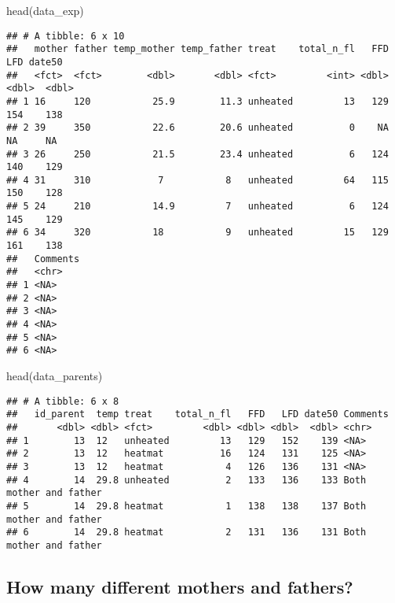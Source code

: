 \documentclass[
]{article}
\newenvironment{Shaded}{\begin{snugshade}}{\end{snugshade}}
\newcommand{\FunctionTok}[1]{\textcolor[rgb]{0.00,0.00,0.00}{#1}}
\newcommand{\NormalTok}[1]{#1}
\begin{document}
\begin{Shaded}
\begin{Highlighting}[]
\FunctionTok{head}\NormalTok{(data\_exp)}
\end{Highlighting}
\end{Shaded}

\begin{verbatim}
## # A tibble: 6 x 10
##   mother father temp_mother temp_father treat    total_n_fl   FFD   LFD date50
##   <fct>  <fct>        <dbl>       <dbl> <fct>         <int> <dbl> <dbl>  <dbl>
## 1 16     120           25.9        11.3 unheated         13   129   154    138
## 2 39     350           22.6        20.6 unheated          0    NA    NA     NA
## 3 26     250           21.5        23.4 unheated          6   124   140    129
## 4 31     310            7           8   unheated         64   115   150    128
## 5 24     210           14.9         7   unheated          6   124   145    129
## 6 34     320           18           9   unheated         15   129   161    138
##   Comments
##   <chr>   
## 1 <NA>    
## 2 <NA>    
## 3 <NA>    
## 4 <NA>    
## 5 <NA>    
## 6 <NA>
\end{verbatim}

\begin{Shaded}
\begin{Highlighting}[]
\FunctionTok{head}\NormalTok{(data\_parents)}
\end{Highlighting}
\end{Shaded}

\begin{verbatim}
## # A tibble: 6 x 8
##   id_parent  temp treat    total_n_fl   FFD   LFD date50 Comments              
##       <dbl> <dbl> <fct>         <dbl> <dbl> <dbl>  <dbl> <chr>                 
## 1        13  12   unheated         13   129   152    139 <NA>                  
## 2        13  12   heatmat          16   124   131    125 <NA>                  
## 3        13  12   heatmat           4   126   136    131 <NA>                  
## 4        14  29.8 unheated          2   133   136    133 Both mother and father
## 5        14  29.8 heatmat           1   138   138    137 Both mother and father
## 6        14  29.8 heatmat           2   131   136    131 Both mother and father
\end{verbatim}

\hypertarget{how-many-different-mothers-and-fathers}{%
\subsection{How many different mothers and
fathers?}\label{how-many-different-mothers-and-fathers}}
\end{document}

